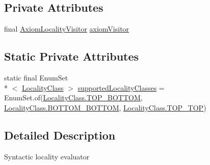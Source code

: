\subsection*{Private Attributes}
\begin{DoxyCompactItemize}
\item 
final \hyperlink{classcom_1_1clarkparsia_1_1owlapi_1_1modularity_1_1locality_1_1_syntactic_locality_evaluator_1_1_axiom_locality_visitor}{Axiom\-Locality\-Visitor} \hyperlink{classcom_1_1clarkparsia_1_1owlapi_1_1modularity_1_1locality_1_1_syntactic_locality_evaluator_a39c99aadaa833ad889b0e85e098c1954}{axiom\-Visitor}
\end{DoxyCompactItemize}
\subsection*{Static Private Attributes}
\begin{DoxyCompactItemize}
\item 
static final Enum\-Set\\*
$<$ \hyperlink{enumcom_1_1clarkparsia_1_1owlapi_1_1modularity_1_1locality_1_1_locality_class}{Locality\-Class} $>$ \hyperlink{classcom_1_1clarkparsia_1_1owlapi_1_1modularity_1_1locality_1_1_syntactic_locality_evaluator_a07d7fdd34bac1b3a0875c51bafe93c41}{supported\-Locality\-Classes} = Enum\-Set.\-of(\hyperlink{enumcom_1_1clarkparsia_1_1owlapi_1_1modularity_1_1locality_1_1_locality_class_ae309a0aa78d530c0a9955297864dceec}{Locality\-Class.\-T\-O\-P\-\_\-\-B\-O\-T\-T\-O\-M}, \hyperlink{enumcom_1_1clarkparsia_1_1owlapi_1_1modularity_1_1locality_1_1_locality_class_a92aad7642054d7749aba9d29a8b119f3}{Locality\-Class.\-B\-O\-T\-T\-O\-M\-\_\-\-B\-O\-T\-T\-O\-M}, \hyperlink{enumcom_1_1clarkparsia_1_1owlapi_1_1modularity_1_1locality_1_1_locality_class_a5ec2368660cbebbd0dab9e6a4df1bcb7}{Locality\-Class.\-T\-O\-P\-\_\-\-T\-O\-P})
\end{DoxyCompactItemize}


\subsection{Detailed Description}
Syntactic locality evaluator 

